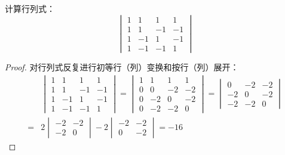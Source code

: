 \begin{problem}
计算行列式：
\begin{equation*}
    \begin{vmatrix}
        1 & 1  & 1  & 1  \\
        1 & 1  & -1 & -1 \\
        1 & -1 & 1  & -1 \\
        1 & -1 & -1 & 1
    \end{vmatrix}
\end{equation*}
\end{problem}
\begin{proof}
    对行列式反复进行初等行（列）变换和按行（列）展开：
    \begin{align*}
          &
        \begin{vmatrix}
            1 & 1  & 1  & 1  \\
            1 & 1  & -1 & -1 \\
            1 & -1 & 1  & -1 \\
            1 & -1 & -1 & 1
        \end{vmatrix}=
        \begin{vmatrix}
            1 & 1  & 1  & 1  \\
            0 & 0  & -2 & -2 \\
            0 & -2 & 0  & -2 \\
            0 & -2 & -2 & 0
        \end{vmatrix}=
        \begin{vmatrix}
            0  & -2 & -2 \\
            -2 & 0  & -2 \\
            -2 & -2 & 0
        \end{vmatrix} \\
        = & 2
        \begin{vmatrix}
            -2 & -2 \\
            -2 & 0
        \end{vmatrix}-2
        \begin{vmatrix}
            -2 & -2 \\
            0  & -2
        \end{vmatrix}=-16
    \end{align*}
\end{proof}

